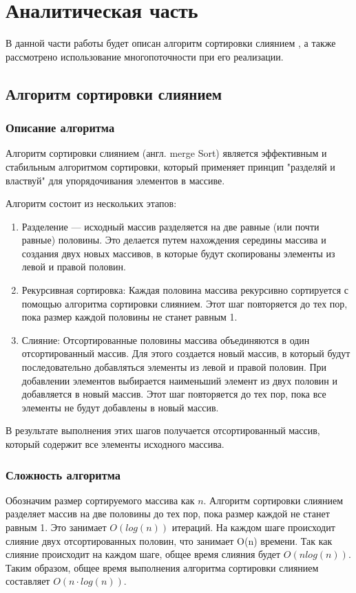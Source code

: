 \chapter{Аналитическая часть}
В данной части работы будет описан  алгоритм сортировки слиянием , 
а также рассмотрено использование многопоточности при его реализации.

\section{Алгоритм сортировки слиянием}


\subsection{Описание алгоритма}
Алгоритм сортировки слиянием (англ. merge Sort) является эффективным и стабильным алгоритмом сортировки, который применяет принцип "разделяй и властвуй" для упорядочивания элементов в массиве.

Алгоритм состоит из нескольких этапов:
\begin{enumerate}
	\item Разделение ---  исходный массив разделяется на две равные (или почти равные) половины. Это делается путем нахождения середины массива и создания двух новых массивов, в которые будут скопированы элементы из левой и правой половин.
	
	\item Рекурсивная сортировка: Каждая половина массива рекурсивно сортируется с помощью алгоритма сортировки слиянием. Этот шаг повторяется до тех пор, пока размер каждой половины не станет равным 1.

	\item Слияние: Отсортированные половины массива объединяются в один отсортированный массив. Для этого создается новый массив, в который будут последовательно добавляться элементы из левой и правой половин. При добавлении элементов выбирается наименьший элемент из двух половин и добавляется в новый массив. Этот шаг повторяется до тех пор, пока все элементы не будут добавлены в новый массив.
\end{enumerate}
В результате выполнения этих шагов получается отсортированный массив, который содержит все элементы исходного массива.

\subsection{Сложность алгоритма}
Обозначим размер сортируемого массива как $n$. 
Алгоритм сортировки слиянием разделяет массив на две половины до тех пор, пока размер каждой  не станет равным 1. Это занимает $O(log(n))$ итераций.
На каждом шаге происходит слияние двух отсортированных половин, что занимает O(n) времени. Так как слияние происходит на каждом шаге, общее время слияния будет $O(n log(n))$.
Таким образом, общее время выполнения алгоритма сортировки слиянием составляет $O(n  \cdot log(n))$.


